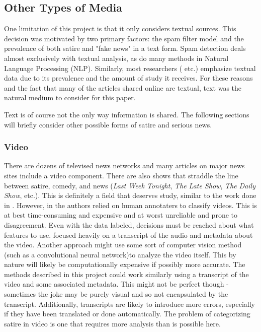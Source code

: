\documentclass [12 pt] {report}
\begin{document}
\subsection{Other Types of Media}
One limitation of this project is that it only considers textual sources. This decision was motivated by two primary factors: the spam filter model and the prevalence of both satire and "fake news" in a text form. Spam detection deals almost exclusively with textual analysis, as do many methods in Natural Language Processing (NLP). Similarly, most researchers (\cite{Ahmad} \cite{Burfoot} \cite{fakeNews} etc.) emphasize textual data due to its prevalence and the amount of study it receives. For these reasons and the fact that many of the articles shared online are textual, text was the natural medium to consider for this paper.

Text is of course not the only way information is shared. The following sections will briefly consider other possible forms of satire and serious news.

\subsubsection*{Video}
There are dozens of televised news networks and many articles on major news sites include a video component. There are also shows that straddle the line between satire, comedy, and news (\textit{Last Week Tonight}, \textit{The Late Show}, \textit{The Daily Show}, etc.). This is definitely a field that deserves study, similar to the work done in \cite{digHumanities}. However, in \cite{digHumanities} the authors relied on human annotaters to classify videos. This is at best time-consuming and expensive and at worst unreliable and prone to disagreement. Even with the data labeled, decisions must be reached about what features to use. \cite{digHumanities} focused heavily on a transcript of the audio and metadata about the video. Another approach might use some sort of computer vision method (such as a convolutional neural network)to analyze the video itself. This by nature will likely be computationally expensive if possibly more accurate. The methods described in this project could work similarly using a transcript of the video and some associated metadata. This might not be perfect though - sometimes the joke may be purely visual and so not encapsulated by the transcript. Additionally, transcripts are likely to introduce more errors, especially if they have been translated or done automatically. The problem of categorizing satire in video is one that requires more analysis than is possible here.
\end{document}
